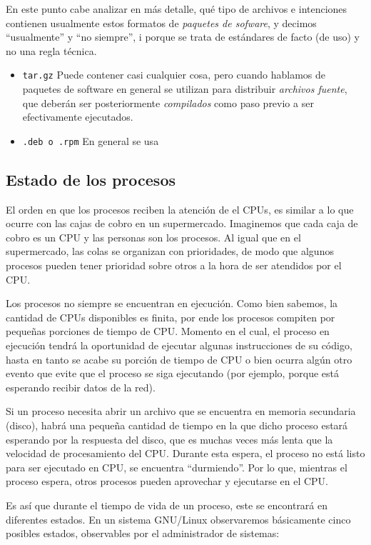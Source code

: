 \documentclass[12pt]{article}
\begin{document}
En este punto cabe analizar en más detalle, qué tipo de archivos e 
intenciones contienen usualmente estos formatos de 
\textit{paquetes de sofware}, y decimos ``usualmente'' y ``no siempre'',  i
porque se trata de estándares de facto (de uso) y no una regla técnica. 

\begin{itemize}
\item \texttt{tar.gz} Puede contener casi cualquier cosa, pero cuando hablamos
de paquetes de software en general se utilizan para distribuir \textit{archivos
fuente}, que deberán ser posteriormente \textit{compilados} como paso previo 
a ser efectivamente ejecutados. 
\item \texttt{.deb o .rpm} En general se usa
\end{itemize}

\subsection*{Estado de los procesos}

El orden en que los procesos reciben la atención de el CPUs, es 
similar a lo que ocurre con las cajas de cobro en un supermercado. 
Imaginemos que cada caja de cobro es un CPU y las personas son los 
procesos. Al igual que en el supermercado, las colas se organizan con 
prioridades, de modo que algunos procesos pueden tener prioridad 
sobre otros a la hora de ser atendidos por el CPU. 

Los procesos no siempre se encuentran en ejecución. 
Como bien sabemos, la cantidad de CPUs disponibles es finita, por ende 
los procesos compiten por 
pequeñas porciones de tiempo de CPU. Momento en el cual, el proceso en 
ejecución tendrá la oportunidad de ejecutar algunas instrucciones de su 
código, hasta en tanto se acabe su porción de tiempo de CPU o bien ocurra 
algún otro evento que evite que el proceso se siga ejecutando (por ejemplo, 
porque está esperando recibir datos de la red). 

Si un proceso necesita abrir un archivo que se encuentra en 
memoria secundaria (disco), habrá una pequeña cantidad de tiempo en la que 
dicho proceso estará esperando por la respuesta del disco, que es muchas 
veces más lenta que la velocidad de procesamiento del CPU. Durante esta
espera, el proceso no está listo para ser ejecutado en CPU, se encuentra 
``durmiendo''. Por lo que, mientras el proceso espera, otros procesos 
pueden aprovechar y ejecutarse en el CPU. 
  
Es así que durante el tiempo de vida de un proceso, este se encontrará en 
diferentes estados. En un sistema GNU/Linux observaremos básicamente 
cinco posibles estados, observables por el administrador de sistemas: 
\end{document}

